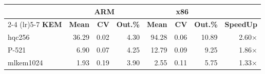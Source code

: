 \begin{table}[!ht]
\begin{tabular}{lrrr|rrr|r}
 \toprule
& \multicolumn{3}{c}{\bfseries ARM} & \multicolumn{3}{c}{\bfseries x86} &\\
\cmidrule(lr){2-4} \cmidrule(lr){5-7}
\textbf{KEM} & \textbf{Mean} & \textbf{CV} & \textbf{Out.\%} & \textbf{Mean} & \textbf{CV} & \textbf{Out.\%} & \textbf{SpeedUp}\\
\midrule
hqc256 & 36.29 & 0.02 & 4.30 & 94.28 & 0.06 & 10.89 & 2.60× \\
P-521 & 6.90 & 0.07 & 4.25 & 12.79 & 0.09 & 9.25 & 1.86× \\
mlkem1024 & 1.93 & 0.19 & 3.90 & 2.55 & 0.11 & 5.75 & 1.33× \\
\bottomrule
\end{tabular}
\end{table}
